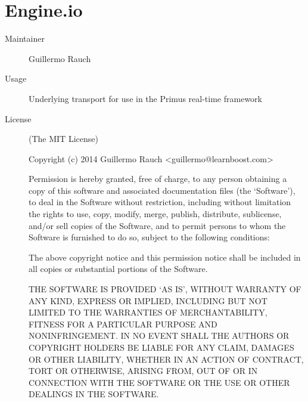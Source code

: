   \section*{Engine.io}
    \begin{description}
      \item[Maintainer] Guillermo Rauch
      \item[Usage] Underlying transport for use in the Primus real-time framework
      \item[License] \scriptsize (The MIT License)

        Copyright (c) 2014 Guillermo Rauch <guillermo@learnboost.com>

        Permission is hereby granted, free of charge, to any person obtaining a copy of this software 
        and associated documentation files (the `Software'), to deal in the Software without restriction, 
        including without limitation the rights to use, copy, modify, merge, publish, distribute, 
        sublicense, and/or sell copies of the Software, and to permit persons to whom the Software is 
        furnished to do so, subject to the following conditions:

        The above copyright notice and this permission notice shall be included in all copies or 
        substantial portions of the Software.

        THE SOFTWARE IS PROVIDED `AS IS', WITHOUT WARRANTY OF ANY KIND, EXPRESS OR IMPLIED, INCLUDING 
        BUT NOT LIMITED TO THE WARRANTIES OF MERCHANTABILITY, FITNESS FOR A PARTICULAR PURPOSE AND 
        NONINFRINGEMENT. IN NO EVENT SHALL THE AUTHORS OR COPYRIGHT HOLDERS BE LIABLE FOR ANY CLAIM, 
        DAMAGES OR OTHER LIABILITY, WHETHER IN AN ACTION OF CONTRACT, TORT OR OTHERWISE, ARISING FROM, 
        OUT OF OR IN CONNECTION WITH THE SOFTWARE OR THE USE OR OTHER DEALINGS IN THE SOFTWARE.
    \end{description}


